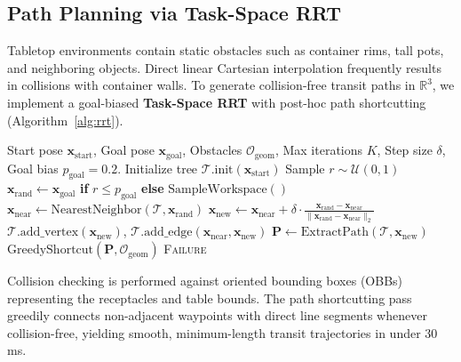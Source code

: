 \documentclass[conference]{IEEEtran}
\begin{document}
\subsection{Path Planning via Task-Space RRT}
Tabletop environments contain static obstacles such as container rims, tall pots, and neighboring objects. Direct linear Cartesian interpolation frequently results in collisions with container walls. To generate collision-free transit paths in $\mathbb{R}^3$, we implement a goal-biased \textbf{Task-Space RRT} with post-hoc path shortcutting (Algorithm~\ref{alg:rrt}).

\begin{algorithm}[!h]
\caption{Goal-Biased Task-Space RRT with Path Shortcutting}
\label{alg:rrt}
\begin{algorithmic}[1]
\Require Start pose $\mathbf{x}_{\text{start}}$, Goal pose $\mathbf{x}_{\text{goal}}$, Obstacles $\mathcal{O}_{\text{geom}}$, Max iterations $K$, Step size $\delta$, Goal bias $p_{\text{goal}}=0.2$.
\State Initialize tree $\mathcal{T}.\text{init}(\mathbf{x}_{\text{start}})$
    \State Sample $r \sim \mathcal{U}(0, 1)$
    \State $\mathbf{x}_{\text{rand}} \gets \mathbf{x}_{\text{goal}}$ \textbf{if} $r \le p_{\text{goal}}$ \textbf{else} $\text{SampleWorkspace}()$
    \State $\mathbf{x}_{\text{near}} \gets \text{NearestNeighbor}(\mathcal{T}, \mathbf{x}_{\text{rand}})$
    \State $\mathbf{x}_{\text{new}} \gets \mathbf{x}_{\text{near}} + \delta \cdot \frac{\mathbf{x}_{\text{rand}} - \mathbf{x}_{\text{near}}}{\|\mathbf{x}_{\text{rand}} - \mathbf{x}_{\text{near}}\|_2}$
        \State $\mathcal{T}.\text{add\_vertex}(\mathbf{x}_{\text{new}})$, $\mathcal{T}.\text{add\_edge}(\mathbf{x}_{\text{near}}, \mathbf{x}_{\text{new}})$
            \State $\mathbf{P} \gets \text{ExtractPath}(\mathcal{T}, \mathbf{x}_{\text{new}})$
            \State \Return $\text{GreedyShortcut}(\mathbf{P}, \mathcal{O}_{\text{geom}})$
        \EndIf
    \EndIf
\EndFor
\State \Return \textsc{Failure}
\end{algorithmic}
\end{algorithm}

Collision checking is performed against oriented bounding boxes (OBBs) representing the receptacles and table bounds. The path shortcutting pass greedily connects non-adjacent waypoints with direct line segments whenever collision-free, yielding smooth, minimum-length transit trajectories in under $30$\,ms.
\end{document}
